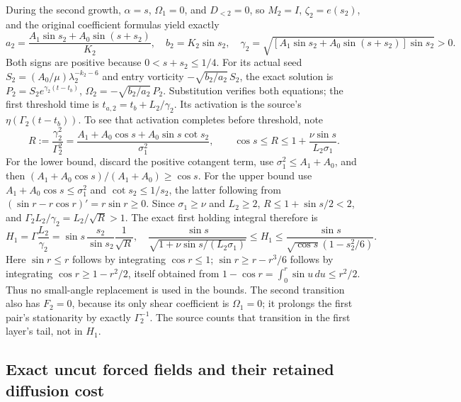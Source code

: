 During the second growth, $\alpha=s$, $\Omega_1=0$, and
$D_{<2}=0$, so $M_2=I$, $\zeta_2=e(s_2)$, and the original
coefficient formulas yield exactly
\begin{equation}
 a_2=\frac{A_1\sin s_2+A_0\sin(s+s_2)}{K_2},\quad
 b_2=K_2\sin s_2,\quad
 \gamma_2=\sqrt{[A_1\sin s_2+A_0\sin(s+s_2)]\sin s_2}>0.
 \label{eq:cv-first-second-growth}
\end{equation}
Both signs are positive because $0<s+s_2\leq1/4$.
For its actual seed $S_2=(A_0/\mu)\lambda_2^{-k_2-6}$ and
entry vorticity $-\sqrt{b_2/a_2}\,S_2$, the exact solution is
$P_2=S_2e^{\gamma_2(t-t_b)}$,
$\Omega_2=-\sqrt{b_2/a_2}\,P_2$.
Substitution verifies both equations; the first threshold time is
$t_{a,2}=t_b+L_2/\gamma_2$.
Its activation is the source's $\eta(\Gamma_2(t-t_b))$.
To see that activation completes before threshold, note
\begin{equation}
 R:=\frac{\gamma_2^2}{\Gamma_2^2}
  =\frac{A_1+A_0\cos s+A_0\sin s\cot s_2}{\sigma_1^2},
 \qquad
 \cos s\leq R\leq1+\frac{\nu\sin s}{L_2\sigma_1}.
 \label{eq:cv-first-rate-ratio}
\end{equation}
For the lower bound, discard the positive cotangent term, use
$\sigma_1^2\leq A_1+A_0$, and then
$(A_1+A_0\cos s)/(A_1+A_0)\geq\cos s$.
For the upper bound use $A_1+A_0\cos s\leq\sigma_1^2$ and
$\cot s_2\leq1/s_2$, the latter following from
$(\sin r-r\cos r)'=r\sin r\geq0$.
Since $\sigma_1\geq\nu$ and $L_2\geq2$,
$R\leq1+\sin s/2<2$, and
$\Gamma_2L_2/\gamma_2=L_2/\sqrt R>1$.
The exact first holding integral therefore is
\begin{equation}
 H_1=\Gamma\frac{L_2}{\gamma_2}
     =\sin s\,\frac{s_2}{\sin s_2}\frac1{\sqrt R},\quad
 \frac{\sin s}{\sqrt{1+\nu\sin s/(L_2\sigma_1)}}
 \leq H_1\leq
 \frac{\sin s}{\sqrt{\cos s}(1-s_2^2/6)}.
 \label{eq:cv-first-exact-holding-cost}
\end{equation}
Here $\sin r\leq r$ follows by integrating $\cos r\leq1$;
$\sin r\geq r-r^3/6$ follows by integrating
$\cos r\geq1-r^2/2$, itself obtained from
$1-\cos r=\int_0^r\sin u\,du\leq r^2/2$.
Thus no small-angle replacement is used in the bounds.
The second transition also has $F_2=0$, because its only shear
coefficient is $\Omega_1=0$; it prolongs the first pair's stationarity
by exactly $\Gamma_2^{-1}$. The source counts that transition in
the first layer's tail, not in $H_1$.

\subsection{Exact uncut forced fields and their retained diffusion cost}

